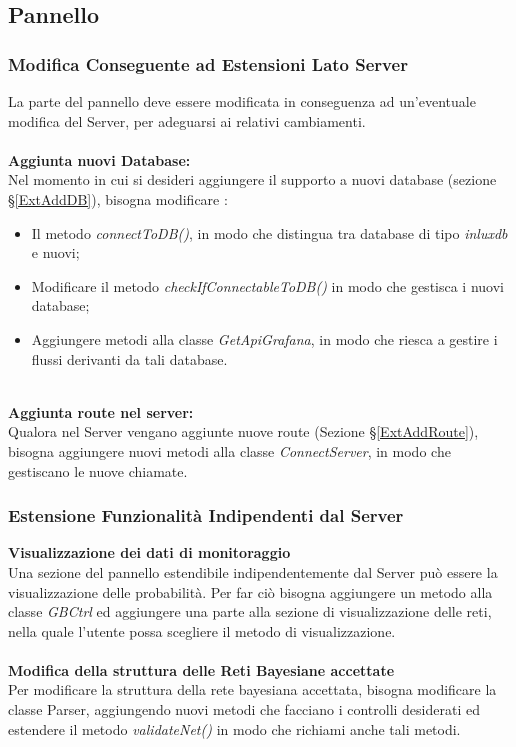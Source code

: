 \subsection{Pannello}\label{estensionePlugin}

\subsubsection{Modifica Conseguente ad Estensioni Lato Server}
La parte del pannello deve essere modificata in conseguenza ad un'eventuale modifica del Server, per adeguarsi ai relativi cambiamenti.\\
~\\
\textbf{Aggiunta nuovi Database:}\\
Nel momento in cui si desideri aggiungere il supporto a nuovi database (sezione §\ref{ExtAddDB}), bisogna modificare :
\begin{itemize}
	\item Il metodo \textit{connectToDB()}, in modo che distingua tra database di tipo \textit{inluxdb} e nuovi;
	\item Modificare il metodo \textit{checkIfConnectableToDB()} in modo che gestisca i nuovi database;
	\item Aggiungere metodi alla classe \textit{GetApiGrafana}, in modo che riesca a gestire i flussi derivanti da tali database.
\end{itemize}
~\\
\textbf{Aggiunta route nel server:}\\
Qualora nel Server vengano aggiunte nuove route (Sezione §\ref{ExtAddRoute}), bisogna aggiungere nuovi metodi alla classe \textit{ConnectServer}, in modo che gestiscano le nuove chiamate.\\


\subsubsection{Estensione Funzionalità Indipendenti dal Server}
\textbf{Visualizzazione dei dati di monitoraggio}\\
Una sezione del pannello estendibile indipendentemente dal Server può essere la visualizzazione delle probabilità. Per far ciò bisogna  aggiungere un metodo alla classe \textit{GBCtrl} ed aggiungere una parte alla sezione di visualizzazione delle reti, nella quale l'utente possa scegliere il metodo di visualizzazione.\\
~\\
\textbf{Modifica della struttura delle Reti Bayesiane accettate}\\
Per modificare la struttura della rete bayesiana accettata, bisogna modificare la classe Parser, aggiungendo nuovi metodi che facciano i controlli desiderati ed estendere il metodo \textit{validateNet()} in modo che richiami anche tali metodi.
